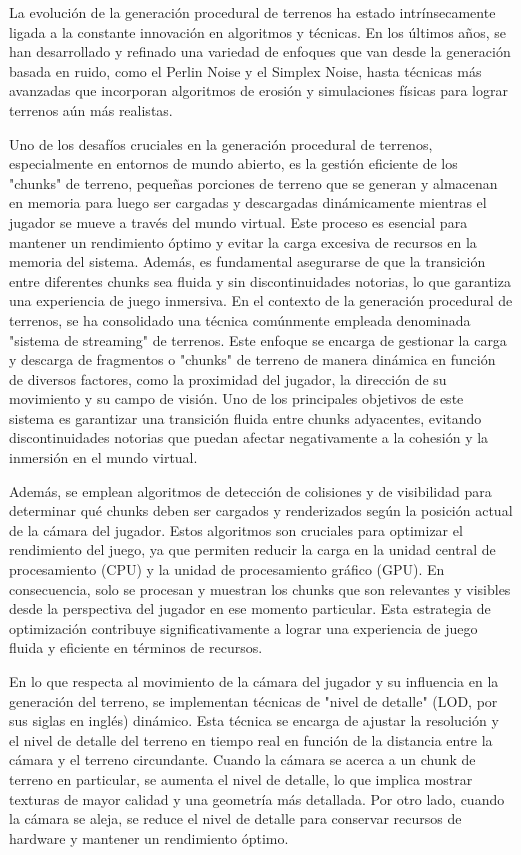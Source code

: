 La evolución de la generación procedural de terrenos ha estado intrínsecamente ligada a la constante innovación en algoritmos y técnicas. En los últimos años, se han desarrollado y refinado una variedad de enfoques que van desde la generación basada en ruido, como el Perlin Noise y el Simplex Noise, hasta técnicas más avanzadas que incorporan algoritmos de erosión y simulaciones físicas para lograr terrenos aún más realistas.

Uno de los desafíos cruciales en la generación procedural de terrenos, especialmente en entornos de mundo abierto, es la gestión eficiente de los "chunks" de terreno, pequeñas porciones de terreno que se generan y almacenan en memoria para luego ser cargadas y descargadas dinámicamente mientras el jugador se mueve a través del mundo virtual. Este proceso es esencial para mantener un rendimiento óptimo y evitar la carga excesiva de recursos en la memoria del sistema. Además, es fundamental asegurarse de que la transición entre diferentes chunks sea fluida y sin discontinuidades notorias, lo que garantiza una experiencia de juego inmersiva. En el contexto de la generación procedural de terrenos, se ha consolidado una técnica comúnmente empleada denominada "sistema de streaming" de terrenos. Este enfoque se encarga de gestionar la carga y descarga de fragmentos o "chunks" de terreno de manera dinámica en función de diversos factores, como la proximidad del jugador, la dirección de su movimiento y su campo de visión. Uno de los principales objetivos de este sistema es garantizar una transición fluida entre chunks adyacentes, evitando discontinuidades notorias que puedan afectar negativamente a la cohesión y la inmersión en el mundo virtual.

Además, se emplean algoritmos de detección de colisiones y de visibilidad para determinar qué chunks deben ser cargados y renderizados según la posición actual de la cámara del jugador. Estos algoritmos son cruciales para optimizar el rendimiento del juego, ya que permiten reducir la carga en la unidad central de procesamiento (CPU) y la unidad de procesamiento gráfico (GPU). En consecuencia, solo se procesan y muestran los chunks que son relevantes y visibles desde la perspectiva del jugador en ese momento particular. Esta estrategia de optimización contribuye significativamente a lograr una experiencia de juego fluida y eficiente en términos de recursos.

En lo que respecta al movimiento de la cámara del jugador y su influencia en la generación del terreno, se implementan técnicas de "nivel de detalle" (LOD, por sus siglas en inglés) dinámico. Esta técnica se encarga de ajustar la resolución y el nivel de detalle del terreno en tiempo real en función de la distancia entre la cámara y el terreno circundante. Cuando la cámara se acerca a un chunk de terreno en particular, se aumenta el nivel de detalle, lo que implica mostrar texturas de mayor calidad y una geometría más detallada. Por otro lado, cuando la cámara se aleja, se reduce el nivel de detalle para conservar recursos de hardware y mantener un rendimiento óptimo.

